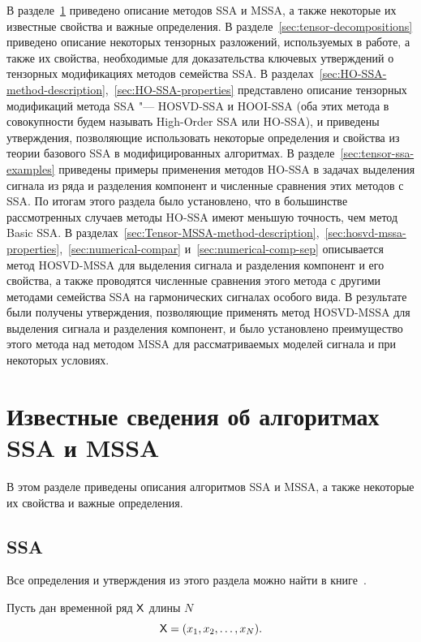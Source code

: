 \documentclass[specialist,
  substylefile=spbu.rtx,
subf,href,colorlinks=true, 12pt]{disser}
\theoremstyle{plain}
\theoremstyle{definition}
\theoremstyle{remark}
\begin{document}
В разделе~\ref{sec:known-results-ssa} приведено описание методов SSA и MSSA, а также некоторые их
известные свойства и важные определения.
В разделе~\ref{sec:tensor-decompositions} приведено описание некоторых тензорных разложений, используемых в работе,
а также их свойства, необходимые для доказательства ключевых утверждений о
тензорных модификациях методов семейства SSA.
В разделах~\ref{sec:HO-SSA-method-description},~\ref{sec:HO-SSA-properties} представлено описание
тензорных модификаций метода SSA "--- HOSVD-SSA и HOOI-SSA (оба этих метода в совокупности будем называть
High-Order SSA или HO-SSA), и приведены утверждения, позволяющие использовать некоторые определения и
свойства из теории базового SSA в модифицированных алгоритмах.
В разделе~\ref{sec:tensor-ssa-examples} приведены примеры применения методов HO-SSA в задачах выделения сигнала
из ряда и разделения компонент и численные сравнения этих методов с SSA.
По итогам этого раздела
было установлено,
что в большинстве рассмотренных случаев методы HO-SSA имеют меньшую точность, чем метод Basic SSA.
В разделах~\ref{sec:Tensor-MSSA-method-description},~\ref{sec:hosvd-mssa-properties},~\ref{sec:numerical-compar}
и~\ref{sec:numerical-comp-sep}
описывается метод HOSVD-MSSA для выделения сигнала и разделения компонент и его свойства, а также
проводятся численные сравнения этого метода с другими методами семейства SSA на гармонических сигналах особого вида.
В результате были получены утверждения, позволяющие применять метод HOSVD-MSSA для выделения сигнала и разделения компонент, и было установлено преимущество этого метода над методом MSSA для рассматриваемых моделей сигнала
и при некоторых условиях.
\newpage


\section{Известные сведения об алгоритмах SSA и MSSA}\label{sec:known-results-ssa}
В этом разделе приведены описания алгоритмов SSA и MSSA, а также некоторые их свойства и важные определения.


\subsection{SSA}\label{subsec:ssa}
Все определения и утверждения из этого раздела можно найти в книге~\cite{ssa}.

Пусть дан временной ряд $\mathsf{X}$ длины $N$
\[
  \mathsf{X}=(x_1,x_2,\ldots,x_N).
\]
\end{document}
